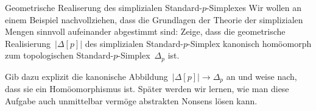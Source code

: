 \documentclass{uebblatt}
\begin{document}

\begin{aufgabe}{Geometrische Realiserung des simplizialen
Standard-$p$-Simplexes}
Wir wollen an einem Beispiel nachvollziehen, dass die Grundlagen
der Theorie der simplizialen Mengen sinnvoll aufeinander abgestimmt sind:
Zeige, dass die geometrische Realisierung~$|\Delta[p]|$ des simplizialen
Standard-$p$-Simplex kanonisch homöomorph zum topologischen
Standard-$p$-Simplex~$\Delta_p$ ist.

Gib dazu explizit die kanonische Abbildung~$|\Delta[p]| \to \Delta_p$ an und
weise nach, dass sie ein Homöomorphismus ist. Später werden wir lernen, wie man
diese Aufgabe auch unmittelbar vermöge abstrakten Nonsens lösen kann.
\end{aufgabe}
\end{document}
